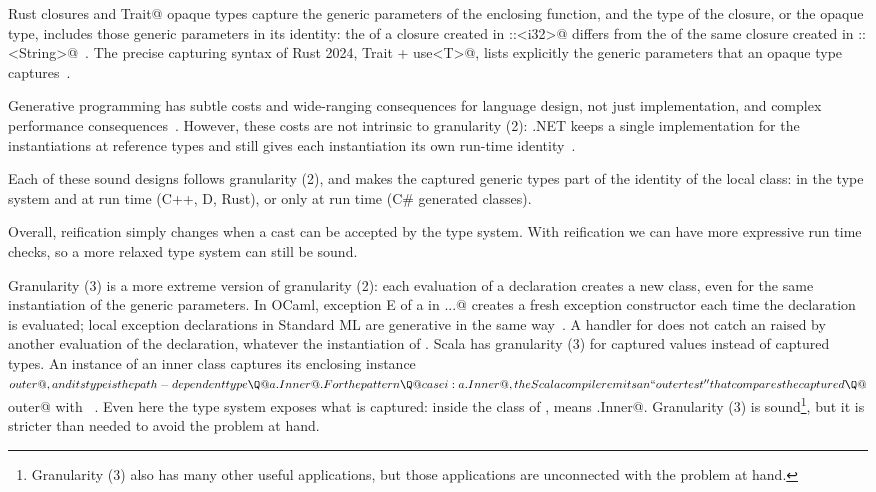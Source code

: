 Rust closures and \Q@impl Trait@ opaque types capture the generic parameters of the enclosing function,
and the type of the closure, or the opaque type, includes those generic parameters in its identity:
the \Q@TypeId@ of a closure created in \Q@m::<i32>@ differs from the \Q@TypeId@ of the same closure created in \Q@m::<String>@~\cite{rustClosures}.
The precise capturing syntax of Rust 2024, \Q@impl Trait + use<T>@, lists explicitly the generic parameters that an opaque type captures~.

Generative programming has subtle costs and wide-ranging consequences for language design, not just implementation,
and complex performance consequences~\cite{odersky2001two,kennedy2001design}.
However, these costs are not intrinsic to granularity (2):
.NET keeps a single implementation for the instantiations at reference types and still gives each instantiation its own run-time identity~\cite{kennedy2001design}.

Each of these sound designs follows granularity (2), and makes the captured generic types part of the identity of the local class:
in the type system and at run time (C++, D, Rust), or only at run time (C\# generated classes).

Overall, reification simply changes when a cast can be accepted by the type system.
With reification we can have more expressive run time checks, so a more relaxed type system can still be sound.

Granularity (3) is a more extreme version of granularity (2): each evaluation of a declaration creates a new class, even for the same instantiation of the generic parameters.
In OCaml, \Q@let exception E of a in ...@ creates a fresh exception constructor each time the declaration is evaluated;
local exception declarations in Standard ML are generative in the same way~.
A handler for \Q@E@ does not catch an \Q@E@ raised by another evaluation of the declaration, whatever the instantiation of \Q@a@.
Scala has granularity (3) for captured values instead of captured types.
An instance of an inner class \Q@Inner@ captures its enclosing instance \Q@$outer@, and its type is the path-dependent type \Q@a.Inner@.
For the pattern \Q@case i: a.Inner@, the Scala compiler emits an ``outer test'' that compares the captured \Q@$outer@ with \Q@a@~.
Even here the type system exposes what is captured: inside the class of \Q@a@, \Q@Inner@ means \Q@this.Inner@.
Granularity (3) is sound\footnote{Granularity (3) also has many other useful applications, but those applications are unconnected with the problem at hand.}, but it is stricter than needed to avoid the problem at hand.

